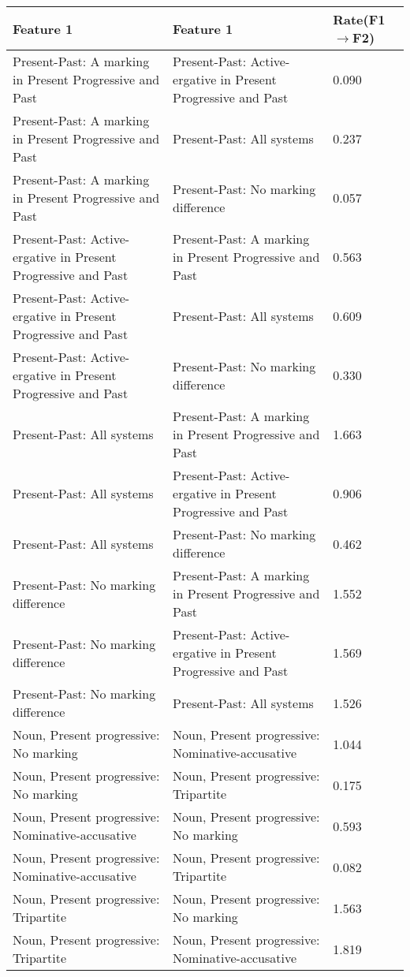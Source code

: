\begin{longtable}{p{.4\linewidth}p{.4\linewidth}p{.1\linewidth}}
\toprule
Feature 1 & Feature 1 & Rate(F1$\rightarrow$F2)\\
\midrule
Present-Past: A marking in Present Progressive and Past & Present-Past: Active-ergative in Present Progressive and Past & 0.090\\
Present-Past: A marking in Present Progressive and Past & Present-Past: All systems & 0.237\\
Present-Past: A marking in Present Progressive and Past & Present-Past: No marking difference & 0.057\\
Present-Past: Active-ergative in Present Progressive and Past & Present-Past: A marking in Present Progressive and Past & 0.563\\
Present-Past: Active-ergative in Present Progressive and Past & Present-Past: All systems & 0.609\\
Present-Past: Active-ergative in Present Progressive and Past & Present-Past: No marking difference & 0.330\\
Present-Past: All systems & Present-Past: A marking in Present Progressive and Past & 1.663\\
Present-Past: All systems & Present-Past: Active-ergative in Present Progressive and Past & 0.906\\
Present-Past: All systems & Present-Past: No marking difference & 0.462\\
Present-Past: No marking difference & Present-Past: A marking in Present Progressive and Past & 1.552\\
Present-Past: No marking difference & Present-Past: Active-ergative in Present Progressive and Past & 1.569\\
Present-Past: No marking difference & Present-Past: All systems & 1.526\\
Noun, Present progressive: No marking & Noun, Present progressive: Nominative-accusative & 1.044\\
Noun, Present progressive: No marking & Noun, Present progressive: Tripartite & 0.175\\
Noun, Present progressive: Nominative-accusative & Noun, Present progressive: No marking & 0.593\\
Noun, Present progressive: Nominative-accusative & Noun, Present progressive: Tripartite & 0.082\\
Noun, Present progressive: Tripartite & Noun, Present progressive: No marking & 1.563\\
Noun, Present progressive: Tripartite & Noun, Present progressive: Nominative-accusative & 1.819\\

\end{longtable}
